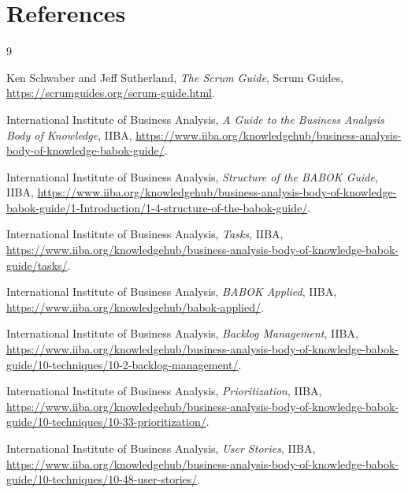 \documentclass[11pt]{article}
\begin{document}
\section*{References}
\begin{thebibliography}{9}

Ken Schwaber and Jeff Sutherland,
\emph{The Scrum Guide}, Scrum Guides,
\url{https://scrumguides.org/scrum-guide.html}.

International Institute of Business Analysis,
\emph{A Guide to the Business Analysis Body of Knowledge}, IIBA,
\url{https://www.iiba.org/knowledgehub/business-analysis-body-of-knowledge-babok-guide/}.

International Institute of Business Analysis,
\emph{Structure of the BABOK Guide}, IIBA,
\url{https://www.iiba.org/knowledgehub/business-analysis-body-of-knowledge-babok-guide/1-Introduction/1-4-structure-of-the-babok-guide/}.

International Institute of Business Analysis,
\emph{Tasks}, IIBA,
\url{https://www.iiba.org/knowledgehub/business-analysis-body-of-knowledge-babok-guide/tasks/}.

International Institute of Business Analysis,
\emph{BABOK Applied}, IIBA,
\url{https://www.iiba.org/knowledgehub/babok-applied/}.

International Institute of Business Analysis,
\emph{Backlog Management}, IIBA,
\url{https://www.iiba.org/knowledgehub/business-analysis-body-of-knowledge-babok-guide/10-techniques/10-2-backlog-management/}.

International Institute of Business Analysis,
\emph{Prioritization}, IIBA,
\url{https://www.iiba.org/knowledgehub/business-analysis-body-of-knowledge-babok-guide/10-techniques/10-33-prioritization/}.

International Institute of Business Analysis,
\emph{User Stories}, IIBA,
\url{https://www.iiba.org/knowledgehub/business-analysis-body-of-knowledge-babok-guide/10-techniques/10-48-user-stories/}.

\end{thebibliography}
\end{document}
